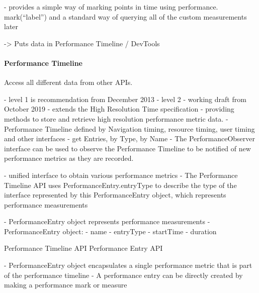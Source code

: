 - provides a simple way of marking points in time using performance. mark(“label”) and a standard way of querying all of the custom measurements later


-> Puts data in Performance Timeline / DevTools





\paragraph{Performance Timeline}


Access all different data from other APIs.

- level 1 is recommendation from December 2013 %
- level 2
- working draft from October 2019
- extends the High Resolution Time specification
- providing methods to store and retrieve high resolution performance metric data.
- Performance Timeline  defined by Navigation timing, resource timing, user timing and other interfaces
- get Entries, by Type, by Name
- The PerformanceObserver interface can be used to observe the Performance Timeline to be notified of new performance metrics as they are recorded.



- unified interface to obtain various performance metrics
- The Performance Timeline API uses PerformanceEntry.entryType to describe the type of the interface represented by this PerformanceEntry object, which represents performance measurements

- PerformanceEntry object represents performance measurements
- PerformanceEntry object:
	- name
	- entryType
	- startTime
	- duration
	
	
	
Performance Timeline API %
Performance Entry API %




- PerformanceEntry object encapsulates a single performance metric that is part of the performance timeline
- A performance entry can be directly created by making a performance mark or measure

